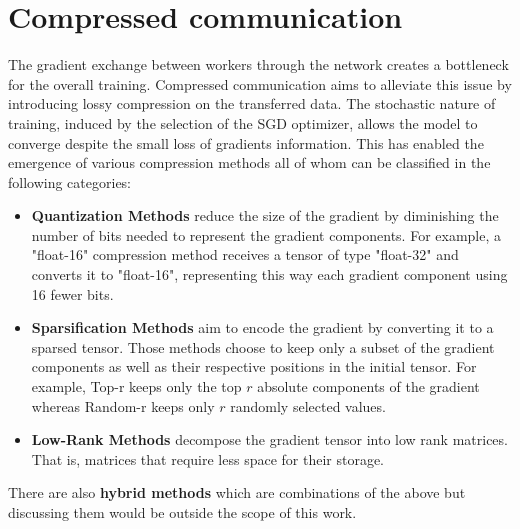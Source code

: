     \section{Compressed communication \cite{10754/662495}}
    
    The gradient exchange between workers through the network creates a bottleneck for the overall training. 
    Compressed communication aims to alleviate this issue by introducing lossy compression on the transferred data.
    The stochastic nature of training, induced by the selection of the SGD optimizer, allows the model to converge despite the small loss of gradients information.
    This has enabled the emergence of various compression methods all of whom can be classified in the following categories:
    
    \begin{itemize}
        \item {\bf Quantization Methods} reduce the size of the gradient by diminishing the number of bits needed to represent the gradient components. 
        For example, a "float-16" compression method receives a tensor of type "float-32" and converts it to "float-16", representing this way each gradient component using 16 fewer bits.
        
        \item {\bf Sparsification Methods} aim to encode the gradient by converting it to a sparsed tensor. Those methods choose to keep only a subset of the gradient components as well as their respective positions in the initial tensor. For example, Top-r keeps only the top $r$ absolute components of the gradient whereas Random-r keeps only $r$ randomly selected values.
        
        \item { \bf Low-Rank Methods} decompose the gradient tensor into low rank matrices. 
        That is, matrices that require less space for their storage.
         
    \end{itemize}
 
    There are also {\bf hybrid methods} which are combinations of the above but discussing them would be outside the scope of this work.
    
